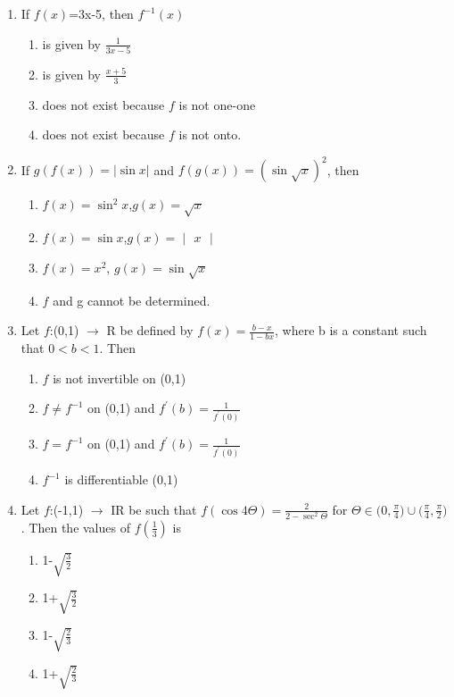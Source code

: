 \begin{enumerate}[label=\arabic*.,ref=\thesubsection.\theenumi]
\item If $f(x)$=3x-5, then $f^{-1}(x)$
\begin{enumerate}
\item is given by $\frac{1}{3x-5}$
\item is given by $\frac{x+5}{3}$
\item does not exist because $f$ is not one-one
\item does not exist because $f$ is not onto.
\end{enumerate}

\item If $g(f(x))=|\sin x|$ and $f(g(x))=(\sin \sqrt{x})^2$, then
\begin{enumerate}
\item $f(x)= \sin^2x$,$g(x)=\sqrt{x}$
\item $f(x)=\sin x$,$g(x)= \begin{vmatrix} x \end{vmatrix}$
\item $f(x)=x^2$, $g(x)=\sin \sqrt{x}$
\item $f$ and g cannot be determined.
\end{enumerate}

\item Let $f$:(0,1) $\rightarrow$ R be defined by $f(x)=\frac{b-x}{1-bx}$, where b is a constant such that $0<b<1$. Then 
\begin{enumerate}
\item $f$ is not invertible on (0,1)
\item $f\neq f^{-1}$ on (0,1) and $f^{'}(b)=\frac{1}{f^{'}(0)}$
\item $f=f^{-1}$ on (0,1) and $f^{'}(b)=\frac{1}{f^{'}(0)}$
\item $f^{-1}$ is differentiable (0,1)
\end{enumerate}

\item Let $f$:(-1,1) $\rightarrow$ IR be such that $f(\cos 4\Theta)=\frac{2}{2-\sec^2\Theta}$ for $\Theta\in\Big(0,\frac{\pi}{4}\Big) \cup \Big(\frac{\pi}{4},\frac{\pi}{2}\Big)$. Then the values of $f(\frac{1}{3})$ is 
\begin{enumerate}
\item 1-$\sqrt{\frac{3}{2}}$
\item 1+$\sqrt{\frac{3}{2}}$
\item 1-$\sqrt{\frac{2}{3}}$
\item 1+$\sqrt{\frac{2}{3}}$
\end{enumerate}


\end{enumerate}
